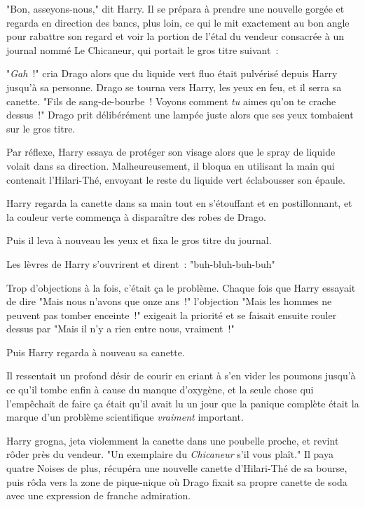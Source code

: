 "Bon, asseyons-nous," dit Harry. Il se prépara à prendre une nouvelle gorgée et regarda en direction des bancs, plus loin, ce qui le mit exactement au bon angle pour rabattre son regard et voir la portion de l'étal du vendeur consacrée à un journal nommé Le Chicaneur, qui portait le gros titre suivant~:


"\emph{Gah}~!" cria Drago alors que du liquide vert fluo était pulvérisé depuis Harry jusqu'à sa personne. Drago se tourna vers Harry, les yeux en feu, et il serra sa canette. "Fils de sang-de-bourbe~! Voyons comment \emph{tu} aimes qu'on te crache dessus~!" Drago prit délibérément une lampée juste alors que ses yeux tombaient sur le gros titre.

Par réflexe, Harry essaya de protéger son visage alors que le spray de liquide volait dans sa direction. Malheureusement, il bloqua en utilisant la main qui contenait l'Hilari-Thé, envoyant le reste du liquide vert éclabousser son épaule.

Harry regarda la canette dans sa main tout en s'étouffant et en postillonnant, et la couleur verte commença à disparaître des robes de Drago.

Puis il leva à nouveau les yeux et fixa le gros titre du journal.


Les lèvres de Harry s'ouvrirent et dirent~: "buh-bluh-buh-buh"

Trop d'objections à la fois, c'était ça le problème. Chaque fois que Harry essayait de dire "Mais nous n'avons que onze ans~!" l'objection "Mais les hommes ne peuvent pas tomber enceinte~!" exigeait la priorité et se faisait ensuite rouler dessus par "Mais il n'y a rien entre nous, vraiment~!"

Puis Harry regarda à nouveau sa canette.

Il ressentait un profond désir de courir en criant à s'en vider les poumons jusqu'à ce qu'il tombe enfin à cause du manque d'oxygène, et la seule chose qui l'empêchait de faire ça était qu'il avait lu un jour que la panique complète était la marque d'un problème scientifique \emph{vraiment} important.

Harry grogna, jeta violemment la canette dans une poubelle proche, et revint rôder près du vendeur. "Un exemplaire du \emph{Chicaneur} s'il vous plaît." Il paya quatre Noises de plus, récupéra une nouvelle canette d'Hilari-Thé de sa bourse, puis rôda vers la zone de pique-nique où Drago fixait sa propre canette de soda avec une expression de franche admiration.

